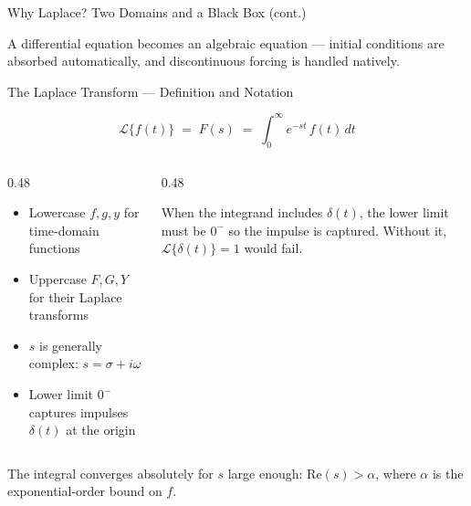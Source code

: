 \documentclass[aspectratio=169,11pt]{beamer}
\begin{document}
\begin{frame}{Why Laplace? Two Domains and a Black Box (cont.)}
\footnotesize
\begin{conceptbox}
A differential equation becomes an algebraic equation --- initial conditions are absorbed automatically, and discontinuous forcing is handled natively.
\end{conceptbox}
\end{frame}

\begin{frame}{The Laplace Transform --- Definition and Notation}
\footnotesize
\begin{formulabox}
\[
\mathcal{L}\{f(t)\} \;=\; F(s) \;=\; \int_0^{\infty} e^{-st}\, f(t)\, dt
\]
\end{formulabox}
\vspace{0.5mm}
\begin{columns}[T]
\begin{column}{0.48\textwidth}
\begin{topicsbox}
\begin{itemize}
\item Lowercase $f, g, y$ for time-domain functions
\item Uppercase $F, G, Y$ for their Laplace transforms
\item $s$ is generally complex: $s = \sigma + i\omega$
\item Lower limit $0^{-}$ captures impulses $\delta(t)$ at the origin
\end{itemize}
\end{topicsbox}
\end{column}
\begin{column}{0.48\textwidth}
\begin{warningbox}
When the integrand includes $\delta(t)$, the lower limit must be $0^{-}$ so the impulse is captured. Without it, $\mathcal{L}\{\delta(t)\} = 1$ would fail.
\end{warningbox}
\end{column}
\end{columns}
\vspace{0.5mm}
\begin{methodbox}[Domain of $s$]
The integral converges absolutely for $s$ large enough: $\mathrm{Re}(s) > \alpha$, where $\alpha$ is the exponential-order bound on $f$.
\end{methodbox}
\end{frame}
\end{document}
